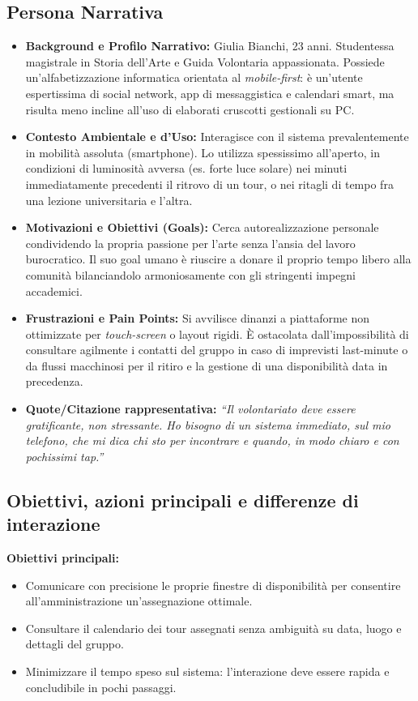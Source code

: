 \subsection{Persona Narrativa}
\begin{itemize}
    \item \textbf{Background e Profilo Narrativo:} Giulia Bianchi, 23 anni. Studentessa magistrale in Storia dell'Arte e Guida Volontaria appassionata. Possiede un'alfabetizzazione informatica orientata al \textit{mobile-first}: è un'utente espertissima di social network, app di messaggistica e calendari smart, ma risulta meno incline all'uso di elaborati cruscotti gestionali su PC.
    \item \textbf{Contesto Ambientale e d'Uso:} Interagisce con il sistema prevalentemente in mobilità assoluta (smartphone). Lo utilizza spessissimo all'aperto, in condizioni di luminosità avversa (es. forte luce solare) nei minuti immediatamente precedenti il ritrovo di un tour, o nei ritagli di tempo fra una lezione universitaria e l'altra.
    \item \textbf{Motivazioni e Obiettivi (Goals):} Cerca autorealizzazione personale condividendo la propria passione per l'arte senza l'ansia del lavoro burocratico. Il suo goal umano è riuscire a donare il proprio tempo libero alla comunità bilanciandolo armoniosamente con gli stringenti impegni accademici.
    \item \textbf{Frustrazioni e Pain Points:} Si avvilisce dinanzi a piattaforme non ottimizzate per \textit{touch-screen} o layout rigidi. È ostacolata dall'impossibilità di consultare agilmente i contatti del gruppo in caso di imprevisti last-minute o da flussi macchinosi per il ritiro e la gestione di una disponibilità data in precedenza.
    \item \textbf{Quote/Citazione rappresentativa:} \textit{``Il volontariato deve essere gratificante, non stressante. Ho bisogno di un sistema immediato, sul mio telefono, che mi dica chi sto per incontrare e quando, in modo chiaro e con pochissimi tap.''}
\end{itemize}

\subsection{Obiettivi, azioni principali e differenze di interazione}
\textbf{Obiettivi principali:}
\begin{itemize}
    \item Comunicare con precisione le proprie finestre di disponibilità per consentire all'amministrazione un'assegnazione ottimale.
    \item Consultare il calendario dei tour assegnati senza ambiguità su data, luogo e dettagli del gruppo.
    \item Minimizzare il tempo speso sul sistema: l'interazione deve essere rapida e concludibile in pochi passaggi.
\end{itemize}

